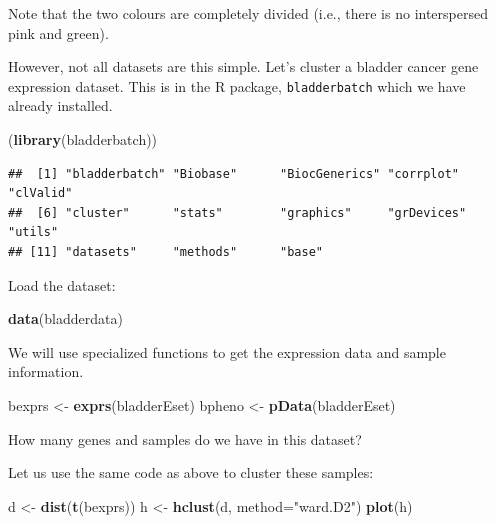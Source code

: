 \documentclass[
]{book}
\newenvironment{Shaded}{\begin{snugshade}}{\end{snugshade}}
\newcommand{\AttributeTok}[1]{\textcolor[rgb]{0.13,0.29,0.53}{#1}}
\newcommand{\FunctionTok}[1]{\textcolor[rgb]{0.13,0.29,0.53}{\textbf{#1}}}
\newcommand{\NormalTok}[1]{#1}
\newcommand{\OtherTok}[1]{\textcolor[rgb]{0.56,0.35,0.01}{#1}}
\newcommand{\StringTok}[1]{\textcolor[rgb]{0.31,0.60,0.02}{#1}}
\begin{document}
Note that the two colours are completely divided (i.e., there is no interspersed pink and green).

However, not all datasets are this simple. Let's cluster a bladder cancer gene expression dataset.
This is in the R package, \texttt{bladderbatch} which we have already installed.

\begin{Shaded}
\begin{Highlighting}[]
\NormalTok{(}\FunctionTok{library}\NormalTok{(bladderbatch))}
\end{Highlighting}
\end{Shaded}

\begin{verbatim}
##  [1] "bladderbatch" "Biobase"      "BiocGenerics" "corrplot"     "clValid"     
##  [6] "cluster"      "stats"        "graphics"     "grDevices"    "utils"       
## [11] "datasets"     "methods"      "base"
\end{verbatim}

Load the dataset:

\begin{Shaded}
\begin{Highlighting}[]
\FunctionTok{data}\NormalTok{(bladderdata)}
\end{Highlighting}
\end{Shaded}

We will use specialized functions to get the expression data and sample information.

\begin{Shaded}
\begin{Highlighting}[]
\NormalTok{bexprs }\OtherTok{\textless{}{-}} \FunctionTok{exprs}\NormalTok{(bladderEset)}
\NormalTok{bpheno }\OtherTok{\textless{}{-}} \FunctionTok{pData}\NormalTok{(bladderEset)}
\end{Highlighting}
\end{Shaded}

How many genes and samples do we have in this dataset?

Let us use the same code as above to cluster these samples:

\begin{Shaded}
\begin{Highlighting}[]
\NormalTok{d }\OtherTok{\textless{}{-}} \FunctionTok{dist}\NormalTok{(}\FunctionTok{t}\NormalTok{(bexprs))}
\NormalTok{h }\OtherTok{\textless{}{-}} \FunctionTok{hclust}\NormalTok{(d, }\AttributeTok{method=}\StringTok{"ward.D2"}\NormalTok{)}
\FunctionTok{plot}\NormalTok{(h)}
\end{Highlighting}
\end{Shaded}
\end{document}
